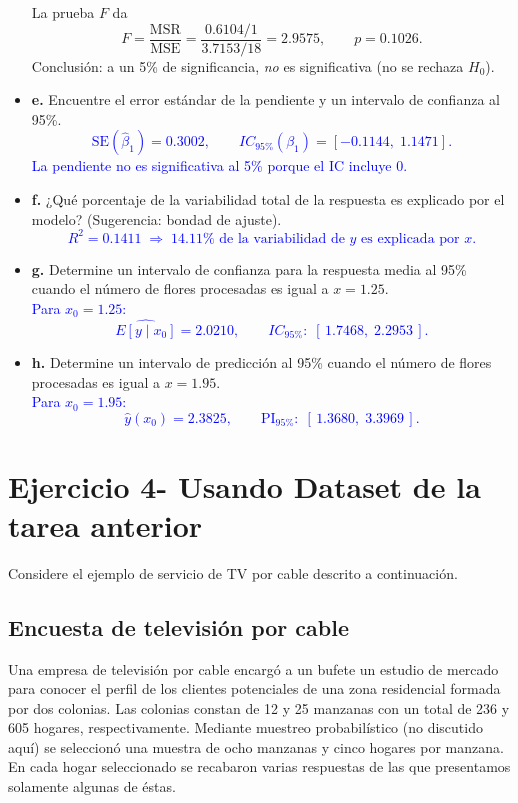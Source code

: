 \documentclass[10pt]{article}
\begin{document}
\begin{itemize}
La prueba $F$ da
\[
  F=\frac{\mathrm{MSR}}{\mathrm{MSE}}=\frac{0.6104/1}{3.7153/18}=2.9575,
  \qquad p=0.1026.
\]
Conclusión: a un 5\% de significancia, \emph{no} es significativa (no se rechaza $H_0$).

\endgroup

    \item \textbf{e.} Encuentre el error estándar de la pendiente y un intervalo de confianza al 95\%.\\
\textcolor{blue}{
\[ \mathrm{SE}(\hat{\beta}_1) = 0.3002, \qquad IC_{95\%}(\beta_1) = [-0.1144,\;1.1471]. \]
La pendiente no es significativa al 5\% porque el IC incluye 0.
}

    \item \textbf{f.} ¿Qué porcentaje de la variabilidad total de la respuesta es explicado por el modelo? (Sugerencia: bondad de ajuste).\\
\textcolor{blue}{
\[ R^2 = 0.1411 \;\Rightarrow\; 14.11\% \text{ de la variabilidad de } y \text{ es explicada por } x. \]
}

    \item \textbf{g.} Determine un intervalo de confianza para la respuesta media al 95\% cuando el número de flores procesadas es igual a $x=1.25$.\\
\textcolor{blue}{
Para $x_0=1.25$:
\[ \widehat{E[y\mid x_0]} = 2.0210, \qquad IC_{95\%}:\; [\,1.7468,\; 2.2953\,]. \]
}

    \item \textbf{h.} Determine un intervalo de predicción al 95\% cuando el número de flores procesadas es igual a $x=1.95$.\\
\textcolor{blue}{
Para $x_0=1.95$:
\[ \hat{y}(x_0) = 2.3825, \qquad \text{PI}_{95\%}:\; [\,1.3680,\; 3.3969\,]. \]
}
\end{itemize}

\section{Ejercicio 4- Usando Dataset de la tarea anterior}
Considere el ejemplo de servicio de TV por cable descrito a continuación.

\subsection*{Encuesta de televisión por cable}
Una empresa de televisión por cable encargó a un bufete un estudio de mercado para conocer el perfil de los clientes potenciales de una zona residencial formada por dos colonias. Las colonias constan de 12 y 25 manzanas con un total de 236 y 605 hogares, respectivamente. Mediante muestreo probabilístico (no discutido aquí) se seleccionó una muestra de ocho manzanas y cinco hogares por manzana. En cada hogar seleccionado se recabaron varias respuestas de las que presentamos solamente algunas de éstas.
\end{document}
